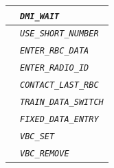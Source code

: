 \begin{itemize}
\begin{longtable}{|l|l|}
				\hline

				&	\begin{minipage}[t]{0.78\linewidth} \emph{\texttt{DMI\_WAIT}} \end{minipage} \\

				\hline

				&	\begin{minipage}[t]{0.78\linewidth} \emph{\texttt{USE\_SHORT\_NUMBER}} \end{minipage} \\

				\hline

				&	\begin{minipage}[t]{0.78\linewidth} \emph{\texttt{ENTER\_RBC\_DATA}} \end{minipage} \\

				\hline

				&	\begin{minipage}[t]{0.78\linewidth} \emph{\texttt{ENTER\_RADIO\_ID}} \end{minipage} \\

				\hline

				&	\begin{minipage}[t]{0.78\linewidth} \emph{\texttt{CONTACT\_LAST\_RBC}} \end{minipage} \\

				\hline

				&	\begin{minipage}[t]{0.78\linewidth} \emph{\texttt{TRAIN\_DATA\_SWITCH}} \end{minipage} \\

				\hline

				&	\begin{minipage}[t]{0.78\linewidth} \emph{\texttt{FIXED\_DATA\_ENTRY}} \end{minipage} \\

				\hline

				&	\begin{minipage}[t]{0.78\linewidth} \emph{\texttt{VBC\_SET}} \end{minipage} \\

				\hline

				&	\begin{minipage}[t]{0.78\linewidth} \emph{\texttt{VBC\_REMOVE}} \end{minipage} \\


\end{longtable}
\end{itemize}
